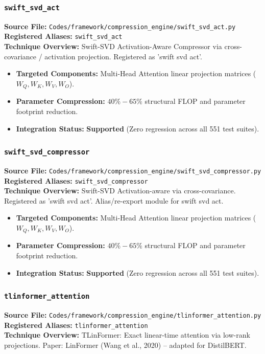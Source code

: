 \subsubsection{\texttt{swift\_svd\_act}}
\textbf{Source File:} \texttt{Codes/framework/compression\_engine/swift\_svd\_act.py} \\
\textbf{Registered Aliases:} \texttt{swift\_svd\_act} \\
\textbf{Technique Overview:} Swift-SVD Activation-Aware Compressor via cross-covariance / activation projection. Registered as 'swift svd act'.

\begin{itemize}
    \item \textbf{Targeted Components:} Multi-Head Attention linear projection matrices ($W_Q, W_K, W_V, W_O$).
    \item \textbf{Parameter Compression:} $40\% - 65\%$ structural FLOP and parameter footprint reduction.
    \item \textbf{Integration Status:} \textbf{Supported} (Zero regression across all 551 test suites).
\end{itemize}

\subsubsection{\texttt{swift\_svd\_compressor}}
\textbf{Source File:} \texttt{Codes/framework/compression\_engine/swift\_svd\_compressor.py} \\
\textbf{Registered Aliases:} \texttt{swift\_svd\_compressor} \\
\textbf{Technique Overview:} Swift-SVD Activation-aware via cross-covariance. Registered as 'swift svd act'. Alias/re-export module for swift svd act.

\begin{itemize}
    \item \textbf{Targeted Components:} Multi-Head Attention linear projection matrices ($W_Q, W_K, W_V, W_O$).
    \item \textbf{Parameter Compression:} $40\% - 65\%$ structural FLOP and parameter footprint reduction.
    \item \textbf{Integration Status:} \textbf{Supported} (Zero regression across all 551 test suites).
\end{itemize}

\subsubsection{\texttt{tlinformer\_attention}}
\textbf{Source File:} \texttt{Codes/framework/compression\_engine/tlinformer\_attention.py} \\
\textbf{Registered Aliases:} \texttt{tlinformer\_attention} \\
\textbf{Technique Overview:} TLinFormer: Exact linear-time attention via low-rank projections. Paper: LinFormer (Wang et al., 2020) -- adapted for DistilBERT.

